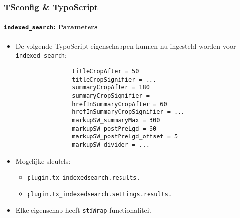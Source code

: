 \begin{frame}[fragile]
	\frametitle{TSconfig \& TypoScript}
	\framesubtitle{\texttt{indexed\_search}: Parameters}

	\lstset{basicstyle=\tiny\ttfamily}

	\begin{itemize}
		\item De volgende TypoScript-eigenschappen kunnen nu ingesteld worden voor \texttt{indexed\_search}:

			\begin{lstlisting}
				titleCropAfter = 50
				titleCropSignifier = ...
				summaryCropAfter = 180
				summaryCropSignifier =
				hrefInSummaryCropAfter = 60
				hrefInSummaryCropSignifier = ...
				markupSW_summaryMax = 300
				markupSW_postPreLgd = 60
				markupSW_postPreLgd_offset = 5
				markupSW_divider = ...
			\end{lstlisting}

		\item Mogelijke sleutels:
			\begin{itemize}
				\item \texttt{plugin.tx\_indexedsearch.results.}
				\item \texttt{plugin.tx\_indexedsearch.settings.results.}
			\end{itemize}

		\item Elke eigenschap heeft \texttt{stdWrap}-functionaliteit

	\end{itemize}

\end{frame}

